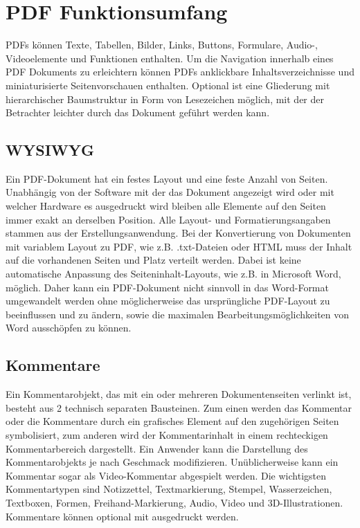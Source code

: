 \section{PDF Funktionsumfang}
PDFs können Texte, Tabellen, Bilder, Links, Buttons, Formulare, Audio-, Videoelemente und Funktionen enthalten.
Um die Navigation innerhalb eines PDF Dokuments zu erleichtern können PDFs anklickbare Inhaltsverzeichnisse und miniaturisierte Seitenvorschauen enthalten. Optional ist eine Gliederung mit hierarchischer Baumstruktur in Form von Lesezeichen möglich, mit der der Betrachter leichter durch das Dokument geführt werden kann. 

\subsection{WYSIWYG}
Ein PDF-Dokument hat ein festes Layout und eine feste Anzahl von Seiten. Unabhängig von der Software mit der das Dokument angezeigt wird oder mit welcher Hardware es ausgedruckt wird bleiben alle Elemente auf den Seiten immer exakt an derselben Position. Alle Layout- und Formatierungsangaben stammen aus der Erstellungsanwendung. Bei der Konvertierung von Dokumenten mit variablem Layout zu PDF, wie z.B. .txt-Dateien oder HTML muss der Inhalt auf die vorhandenen Seiten und Platz verteilt werden. Dabei ist keine automatische Anpassung des Seiteninhalt-Layouts, wie z.B. in Microsoft Word, möglich. Daher kann ein PDF-Dokument nicht sinnvoll in das Word-Format umgewandelt werden ohne möglicherweise das ursprüngliche PDF-Layout zu beeinflussen und zu ändern, sowie die maximalen Bearbeitungsmöglichkeiten von Word ausschöpfen zu können.

\subsection{Kommentare}
Ein Kommentarobjekt, das mit ein oder mehreren Dokumentenseiten verlinkt ist, besteht aus 2 technisch separaten Bausteinen. Zum einen werden das Kommentar oder die Kommentare durch ein grafisches Element auf den zugehörigen Seiten symbolisiert, zum anderen wird der Kommentarinhalt in einem rechteckigen Kommentarbereich dargestellt. Ein Anwender kann die Darstellung des Kommentarobjekts je nach Geschmack modifizieren. Unüblicherweise kann ein Kommentar sogar als Video-Kommentar abgespielt werden. Die wichtigsten Kommentartypen sind Notizzettel, Textmarkierung, Stempel, Wasserzeichen, Textboxen, Formen, Freihand-Markierung, Audio, Video und 3D-Illustrationen. Kommentare können optional mit ausgedruckt werden. \cite{softx}


